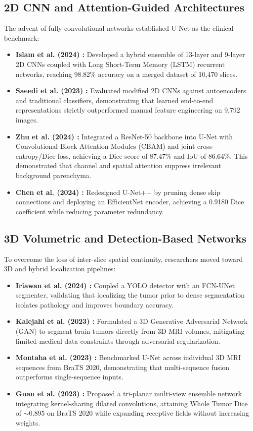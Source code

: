 \documentclass[12pt, a4paper]{article}
\begin{document}
\subsection{2D CNN and Attention-Guided Architectures}
The advent of fully convolutional networks established U-Net as the clinical benchmark:
\begin{itemize}[leftmargin=*, itemsep=4pt]
    \item \textbf{Islam et al. (2024) \cite{islam2024improved}:} Developed a hybrid ensemble of 13-layer and 9-layer 2D CNNs coupled with Long Short-Term Memory (LSTM) recurrent networks, reaching 98.82\% accuracy on a merged dataset of 10,470 slices.
    \item \textbf{Saeedi et al. (2023) \cite{saeedi2023mri}:} Evaluated modified 2D CNNs against autoencoders and traditional classifiers, demonstrating that learned end-to-end representations strictly outperformed manual feature engineering on 9,792 images.
    \item \textbf{Zhu et al. (2024) \cite{zhu2024improvedunet}:} Integrated a ResNet-50 backbone into U-Net with Convolutional Block Attention Modules (CBAM) and joint cross-entropy/Dice loss, achieving a Dice score of 87.47\% and IoU of 86.64\%. This demonstrated that channel and spatial attention suppress irrelevant background parenchyma.
    \item \textbf{Chen et al. (2024) \cite{chen2024unetpp}:} Redesigned U-Net++ by pruning dense skip connections and deploying an EfficientNet encoder, achieving a 0.9180 Dice coefficient while reducing parameter redundancy.
\end{itemize}

\subsection{3D Volumetric and Detection-Based Networks}
To overcome the loss of inter-slice spatial continuity, researchers moved toward 3D and hybrid localization pipelines:
\begin{itemize}[leftmargin=*, itemsep=4pt]
    \item \textbf{Iriawan et al. (2024) \cite{iriawan2024yolounet}:} Coupled a YOLO detector with an FCN-UNet segmenter, validating that localizing the tumor prior to dense segmentation isolates pathology and improves boundary accuracy.
    \item \textbf{Kalejahi et al. (2023) \cite{kalejahi2023gan}:} Formulated a 3D Generative Adversarial Network (GAN) to segment brain tumors directly from 3D MRI volumes, mitigating limited medical data constraints through adversarial regularization.
    \item \textbf{Montaha et al. (2023) \cite{montaha2023unet}:} Benchmarked U-Net across individual 3D MRI sequences from BraTS 2020, demonstrating that multi-sequence fusion outperforms single-sequence inputs.
    \item \textbf{Guan et al. (2023) \cite{guan2023multiview}:} Proposed a tri-planar multi-view ensemble network integrating kernel-sharing dilated convolutions, attaining Whole Tumor Dice of $\sim 0.895$ on BraTS 2020 while expanding receptive fields without increasing weights.
\end{itemize}
\end{document}
